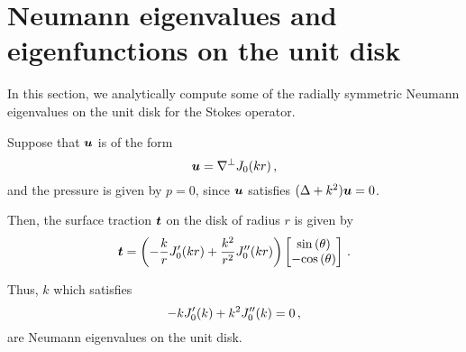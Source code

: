 \section{Neumann eigenvalues and eigenfunctions on the unit disk}
In this section, we analytically compute some of the radially symmetric 
Neumann eigenvalues on the unit disk for the Stokes operator.

Suppose that ${\boldsymbol u}$ is of the form
\begin{equation}
{\boldsymbol u} = \nabla^{\perp} J_{0}(kr) \, ,
\end{equation}
and the pressure is given by $p=0$, since
${\boldsymbol u}$ satisfies $(\Delta + k^2){\boldsymbol u} = 0$.

Then, the surface traction ${\boldsymbol t}$ on the disk of radius $r$ 
is given by
\begin{equation}
{\boldsymbol t} = 
\left( -\frac{k}{r}J_{0}'(kr)  + \frac{k^2}{r^2} J_{0}''(kr)\right)
\begin{bmatrix}
{\sin{(\theta)}} \\
-{\cos{(\theta)}}
\end{bmatrix} \, .
\end{equation}

Thus, $k$ which satisfies
\begin{equation}
-k J_{0}'(k) + k^2 J_{0}''(k) = 0 \, ,
\end{equation}
are Neumann eigenvalues on the unit disk.

